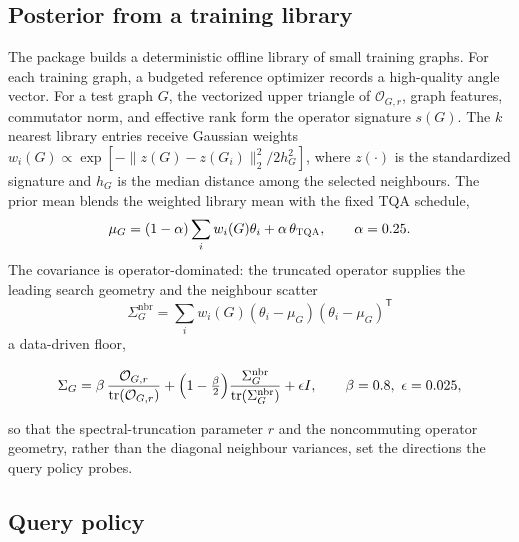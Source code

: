\documentclass[aps,prresearch,reprint,amsmath,amssymb,floatfix,nofootinbib,superscriptaddress,longbibliography]{revtex4-2}
\theoremstyle{remark}
\newcommand{\TQA}{\textnormal{\textsc{TQA}}}
\newcommand{\calO}{\mathcal{O}}
\begin{document}
\subsection{Posterior from a training library}

The package builds a deterministic offline library of small training graphs.
For each training graph, a budgeted reference optimizer records a high-quality
angle vector.  For a test graph \(G\), the vectorized upper triangle of
\(\calO_{G,r}\), graph features, commutator norm, and effective rank form the
operator signature \(s(G)\).  The \(k\) nearest library entries receive Gaussian
weights \(w_i(G)\propto\exp[-\|z(G)-z(G_i)\|_2^2/2h_G^2]\), where \(z(\cdot)\) is
the standardized signature and \(h_G\) is the median distance among the selected
neighbours.  The prior mean blends the weighted library mean with the fixed
\TQA{} schedule,
\begin{equation}
    \mu_G=(1-\alpha)\sum_i w_i(G)\theta_i+\alpha\,\theta_{\TQA},
    \qquad \alpha=0.25.
\end{equation}
The covariance is operator-dominated: the truncated operator supplies the leading
search geometry and the neighbour scatter
\begin{equation}
    \Sigma_G^{\mathrm{nbr}}=\sum_i w_i(G)(\theta_i-\mu_G)(\theta_i-\mu_G)^{\mathsf T}
\end{equation}
a data-driven floor,
\begin{widetext}
\begin{equation}
    \Sigma_G =
    \beta\,\frac{\calO_{G,r}}{\operatorname{tr}(\calO_{G,r})}
    +\Bigl(1-\tfrac{\beta}{2}\Bigr)\frac{\Sigma_G^{\mathrm{nbr}}}{\operatorname{tr}(\Sigma_G^{\mathrm{nbr}})}
    +\epsilon I,
    \qquad \beta=0.8,\ \epsilon=0.025,
    \label{eq:covariance}
\end{equation}
\end{widetext}
so that the spectral-truncation parameter \(r\) and the noncommuting operator
geometry, rather than the diagonal neighbour variances, set the directions the
query policy probes.

\subsection{Query policy}
\label{sec:query}
\end{document}
